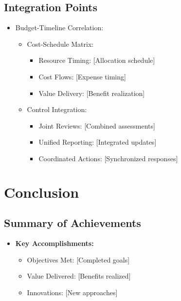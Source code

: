 \documentclass{article}
\begin{document}
\subsection{Integration Points}
\begin{itemize}
    \item Budget-Timeline Correlation:
    \begin{itemize}
        \item Cost-Schedule Matrix:
        \begin{itemize}
            \item Resource Timing: [Allocation schedule]
            \item Cost Flows: [Expense timing]
            \item Value Delivery: [Benefit realization]
        \end{itemize}
        \item Control Integration:
        \begin{itemize}
            \item Joint Reviews: [Combined assessments]
            \item Unified Reporting: [Integrated updates]
            \item Coordinated Actions: [Synchronized responses]
        \end{itemize}
    \end{itemize}
\end{itemize}
\section{Conclusion}
\subsection{Summary of Achievements}
\begin{itemize}
    \item \textbf{Key Accomplishments:}
    \begin{itemize}
        \item Objectives Met: [Completed goals]
        \item Value Delivered: [Benefits realized]
        \item Innovations: [New approaches]
    \end{itemize}
\end{itemize}
\end{document}
